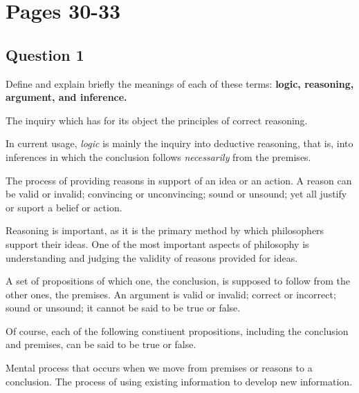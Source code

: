
\section{Pages 30-33}

\subsection{Question 1}
Define and explain briefly the meanings of each of these terms: 
\textbf{logic, reasoning, argument, and inference.}

\begin{definition}[Logic]
    The inquiry which has for its object the principles of correct reasoning.

    In current usage, \textit{logic} is mainly the inquiry into deductive reasoning,
    that is, into inferences in which the conclusion follows \textit{necessarily} from the premises.
\end{definition}

\begin{definition}[Reasoning]
    The process of providing reasons in support of an idea or an action.
    A reason can be valid or invalid; convincing or unconvincing; sound or unsound; 
    yet all justify or suport a belief or action.
\end{definition}
Reasoning is important, as it is the primary method by which
philosophers support their ideas. One of the most important aspects of philosophy 
is understanding and judging the validity of reasons provided for ideas.

\begin{definition}[Argument]
    A set of propositions of which one, the conclusion, is supposed to follow 
    from the other ones, the premises. An argument is valid or invalid; correct
    or incorrect; sound or unsound; it cannot be said to be true or false.

    Of course, each of the following constiuent propositions, including the 
    conclusion and premises, can be said to be true or false.
\end{definition}

\begin{definition}[Inference]
    Mental process that occurs when we move from premises or reasons to 
    a conclusion. The process of using existing information to develop new information.
\end{definition}

